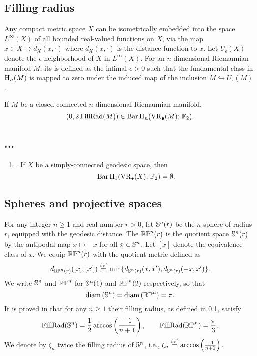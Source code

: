 \subsection{Filling radius}\label{ss:filling_radius}

Any compact metric space $X$ can be isometrically embedded into the space $L^\infty(X)$ of all bounded real-valued functions on $X$, via the map $x\in X\mapsto d_X(x,\cdot)$ where $d_X(x,\cdot)$ is the distance function to $x$. Let $U_\epsilon(X)$ denote the $\epsilon$-neighborhood of $X$ in $L^\infty(X)$.
For an $n$-dimensional Riemannian manifold $M$, its  is defined as the infimal $\epsilon>0$ such that the fundamental class in $\operatorname{H}_n(M)$ is mapped to zero under the induced map of the inclusion $M \hookrightarrow U_\epsilon(M)$ \cite[page 108]{gromov2007metric}.

\begin{proposition}\label{prop:manifold}
	If $M$ be a closed connected $n$-dimensional Riemannian manifold,
	\[
	(0,2\operatorname{FillRad}(M)) \in \operatorname{Bar} \operatorname{H}_{n}(\operatorname{VR}_\bullet(M);\,{\mathbb{F}_2}).
	\]
\end{proposition}

\subsection{...}

\begin{enumerate}

	\item\label{prop:pH1} {\rm \cite[Prop.~7.10]{virk20201}}.
	If $X$ be a simply-connected geodesic space, then
	\[
	\operatorname{Bar} \operatorname{H}_{1}(\operatorname{VR}_\bullet(X);\,{\mathbb{F}_2}) = \emptyset.
	\]
\end{enumerate}

\subsection{Spheres and projective spaces}

For any integer $n \geq 1$ and real number $r > 0$, let $\mathbb{S}^n(r)$ be the $n$-sphere of radius $r$, equipped with the geodesic distance.
The  $\mathbb{RP}^n(r)$ is the quotient space $\mathbb{S}^n(r)$ by the antipodal map $x \mapsto -x$ for all $x \in \mathbb{S}^n$.
Let $[x]$ denote the equivalence class of $x$. We equip $\mathbb{RP}^n(r)$ with the quotient metric defined as
\[
d_{\mathbb{RP}^n(r)}([x],[x'])\stackrel{\mathrm{def}}{=}\min \{d_{\mathbb{S}^n(r)}(x,x'),d_{\mathbb{S}^n(r)}(-x,x')\}.
\]
We write $\mathbb{S}^n$ and $\mathbb{RP}^n$ for $\mathbb{S}^n(1)$ and $\mathbb{RP}^n(2)$ respectively, so that
\[
\operatorname{diam} \left(\mathbb{S}^n \right) = \operatorname{diam}\left(\mathbb{RP}^n \right) = \pi.
\]
It is proved in \cite{katz1983filling} that for any $n \geq 1$ their filling radius, as defined in \cref{ss:filling_radius}, satisfy
\[
\operatorname{FillRad}(\mathbb{S}^n) = \frac{1}{2}\arccos\left(\frac{-1}{n+1}\right), \qquad \operatorname{FillRad}(\mathbb{RP}^n)=\frac{\pi}{3}.
\]
We denote by $\zeta_n$ twice the filling radius of $\mathbb{S}^n$, i.e., $\zeta_n \stackrel{\mathrm{def}}{=} \arccos\left(\frac{-1}{n+1}\right)$.

